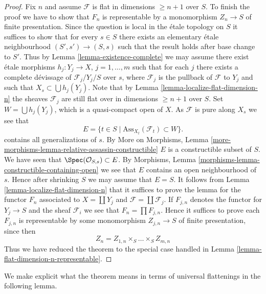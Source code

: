 \begin{proof}
\medskip\noindent
Fix $n$ and assume $\mathcal{F}$ is flat in dimensions $\geq n + 1$
over $S$. To finish the proof we have to show that $F_n$ is representable
by a monomorphism $Z_n \to S$ of finite presentation.
Since the question is local in the \'etale topology on $S$ it suffices to
show that for every $s \in S$ there exists an elementary \'etale neighbourhood
$(S', s') \to (S, s)$ such that the result holds after base change to $S'$.
Thus by
Lemma \ref{lemma-existence-complete}
we may assume there exist \'etale morphisms $h_j : Y_j \to X$,
$j = 1, \ldots, m$ such that for each $j$ there exists a complete
d\'evissage of $\mathcal{F}_j/Y_j/S$ over $s$,
where $\mathcal{F}_j$ is the pullback of $\mathcal{F}$ to $Y_j$
and such that $X_s \subset \bigcup h_j(Y_j)$. Note that by
Lemma \ref{lemma-localize-flat-dimension-n}
the sheaves $\mathcal{F}_j$ are still flat over in
dimensions $\geq n + 1$ over $S$.
Set $W = \bigcup h_j(Y_j)$, which is a quasi-compact open of $X$.
As $\mathcal{F}$ is pure along $X_s$ we see that
$$
E = \{t \in S \mid \text{Ass}_{X_t}(\mathcal{F}_t) \subset W \}.
$$
contains all generalizations of $s$. By
More on Morphisms,
Lemma \ref{more-morphisms-lemma-relative-assassin-constructible}
$E$ is a constructible subset of $S$. We have seen that
$\Spec(\mathcal{O}_{S, s}) \subset E$. By
Morphisms, Lemma \ref{morphisms-lemma-constructible-containing-open}
we see that $E$ contains an open neighbourhood of $s$.
Hence after shrinking $S$ we may assume that $E = S$.
It follows from
Lemma \ref{lemma-localize-flat-dimension-n}
that it suffices to prove the lemma for the functor $F_n$ associated to
$X = \coprod Y_j$ and $\mathcal{F} = \coprod \mathcal{F}_j$.
If $F_{j, n}$ denotes the functor for $Y_j \to S$ and the sheaf
$\mathcal{F}_i$ we see that $F_n = \prod F_{j, n}$. Hence it suffices
to prove each $F_{j, n}$ is representable by some monomorphism
$Z_{j, n} \to S$ of finite presentation, since then
$$
Z_n = Z_{1, n} \times_S \ldots \times_S Z_{m, n}
$$
Thus we have reduced the theorem to the special case handled in
Lemma \ref{lemma-flat-dimension-n-representable}.
\end{proof}

\noindent
We make explicit what the theorem means in terms of universal
flattenings in the following lemma.

